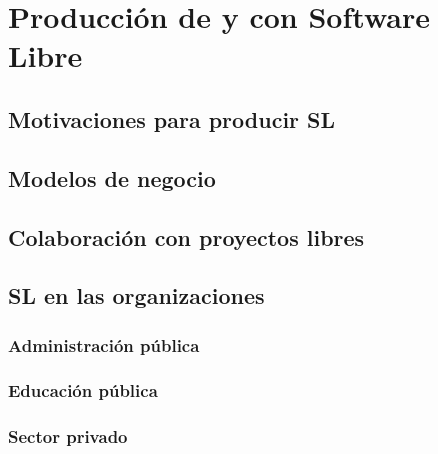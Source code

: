 
\section{Producción de y con Software Libre}

\subsection {Motivaciones para producir SL}

\subsection {Modelos de negocio}

\subsection {Colaboración con proyectos libres}

\subsection {SL en las organizaciones}
\subsubsection {Administración pública}
\subsubsection {Educación pública}
\subsubsection {Sector privado}
